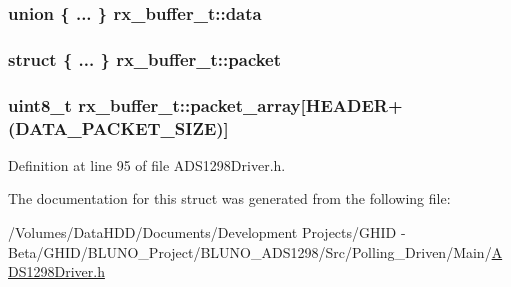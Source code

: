 \hypertarget{structrx__buffer__t_a81c8b33ce7d32d86c994e3db9c8b32c6}{
\subsubsection[{data}]{\setlength{\rightskip}{0pt plus 5cm}union \{ ... \}  {\bf rx\-\_\-buffer\-\_\-t\-::data}}}\label{structrx__buffer__t_a81c8b33ce7d32d86c994e3db9c8b32c6}
\hypertarget{structrx__buffer__t_a188d30440082b11b38ec018289ab2c66}{
\subsubsection[{packet}]{\setlength{\rightskip}{0pt plus 5cm}struct \{ ... \}  {\bf rx\-\_\-buffer\-\_\-t\-::packet}}}\label{structrx__buffer__t_a188d30440082b11b38ec018289ab2c66}
\hypertarget{structrx__buffer__t_a9dd47697370d70c9480f70f9de80809f}{
\subsubsection[{packet\-\_\-array}]{\setlength{\rightskip}{0pt plus 5cm}uint8\-\_\-t {\bf rx\-\_\-buffer\-\_\-t\-::packet\-\_\-array}\mbox{[}{\bf \-H\-E\-A\-D\-E\-R}+({\bf \-D\-A\-T\-A\-\_\-\-P\-A\-C\-K\-E\-T\-\_\-\-S\-I\-Z\-E})\mbox{]}}}\label{structrx__buffer__t_a9dd47697370d70c9480f70f9de80809f}


\-Definition at line 95 of file \-A\-D\-S1298\-Driver.\-h.



\-The documentation for this struct was generated from the following file\-:\begin{DoxyCompactItemize}
\item 
/\-Volumes/\-Data\-H\-D\-D/\-Documents/\-Development Projects/\-G\-H\-I\-D -\/ Beta/\-G\-H\-I\-D/\-B\-L\-U\-N\-O\-\_\-\-Project/\-B\-L\-U\-N\-O\-\_\-\-A\-D\-S1298/\-Src/\-Polling\-\_\-\-Driven/\-Main/\hyperlink{_a_d_s1298_driver_8h}{\-A\-D\-S1298\-Driver.\-h}\end{DoxyCompactItemize}

